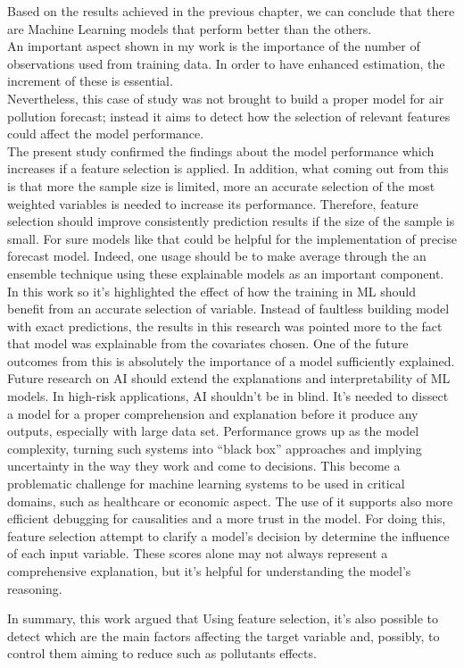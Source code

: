 Based on the results achieved in the previous chapter, we can conclude that there are Machine Learning models that perform better than the others.\\
An important aspect shown in my work is the importance of the number of observations used from training data. In order to have enhanced estimation, the increment of these is essential.\\
Nevertheless, this case of study was not brought to build a proper model for air pollution forecast; instead it aims to detect how the selection of relevant features could affect the model performance. \\
The present study confirmed the findings about the model performance which increases if a feature selection is applied.
In addition, what coming out from this is that more the sample size is limited, more an accurate selection of the most weighted variables is needed to increase its performance.
Therefore, feature selection should improve consistently prediction results if the size of the sample is small.
For sure models like that could be helpful for the implementation of precise forecast model. Indeed, one usage should be to make average through the an ensemble technique using these explainable models as an important component.
\\
In this work so it's highlighted the effect of how the training in ML should benefit from an accurate selection of variable. 
Instead of faultless building model with exact predictions, the results in this research was pointed more to the fact that model was explainable from the covariates chosen. 
One of the future outcomes from this is absolutely the importance of a model sufficiently explained.
Future research on AI should extend the explanations and interpretability of ML models.
In high-risk applications, AI shouldn't be in blind. 
It's needed to dissect a model for a proper comprehension and explanation before it produce any outputs, especially with large data set.
Performance grows up as the model complexity, turning such systems into “black box” approaches and implying uncertainty in
the way they work and come to decisions. This become a problematic challenge for machine learning systems to be used in critical domains, such as healthcare or economic aspect.
The use of it supports also more efficient debugging for  causalities and a more trust in the model.
For doing this, feature selection attempt to clarify a model’s decision by determine the influence of each input variable. 
These scores alone may not always represent a comprehensive explanation, but it's helpful for understanding the model’s reasoning.



In summary, this work argued that 
Using feature selection, it's also possible to detect which are the main factors affecting the target variable and, possibly, to control them aiming to reduce such as pollutants effects.\\